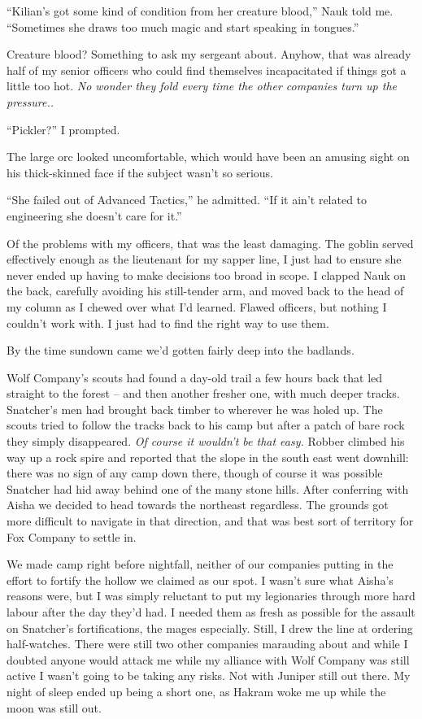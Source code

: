 \documentclass[12pt, openany]{book}
\begin{document}
“Kilian’s got some kind of condition from her creature blood,” Nauk told me. “Sometimes she draws too much magic and start speaking in tongues.”

Creature blood? Something to ask my sergeant about. Anyhow, that was already half of my senior officers who could find themselves incapacitated if things got a little too hot. \textit{No wonder they fold every time the other companies turn up the pressure..}

“Pickler?” I prompted.

The large orc looked uncomfortable, which would have been an amusing sight on his thick-skinned face if the subject wasn’t so serious.

“She failed out of Advanced Tactics,” he admitted. “If it ain’t related to engineering she doesn’t care for it.”

Of the problems with my officers, that was the least damaging. The goblin served effectively enough as the lieutenant for my sapper line, I just had to ensure she never ended up having to make decisions too broad in scope. I clapped Nauk on the back, carefully avoiding his still-tender arm, and moved back to the head of my column as I chewed over what I’d learned. Flawed officers, but nothing I couldn’t work with. I just had to find the right way to use them.

By the time sundown came we’d gotten fairly deep into the badlands. 

Wolf Company’s scouts had found a day-old trail a few hours back that led straight to the forest – and then another fresher one, with much deeper tracks. Snatcher’s men had brought back timber to wherever he was holed up. The scouts tried to follow the tracks back to his camp but after a patch of bare rock they simply disappeared. \textit{Of course it wouldn’t be that easy.} Robber climbed his way up a rock spire and reported that the slope in the south east went downhill: there was no sign of any camp down there, though of course it was possible Snatcher had hid away behind one of the many stone hills. After conferring with Aisha we decided to head towards the northeast regardless. The grounds got more difficult to navigate in that direction, and that was best sort of territory for Fox Company to settle in.

We made camp right before nightfall, neither of our companies putting in the effort to fortify the hollow we claimed as our spot. I wasn’t sure what Aisha’s reasons were, but I was simply reluctant to put my legionaries through more hard labour after the day they’d had. I needed them as fresh as possible for the assault on Snatcher’s fortifications, the mages especially. Still, I drew the line at ordering half-watches. There were still two other companies marauding about and while I doubted anyone would attack me while my alliance with Wolf Company was still active I wasn’t going to be taking any risks. Not with Juniper still out there. My night of sleep ended up being a short one, as Hakram woke me up while the moon was still out.
\end{document}
